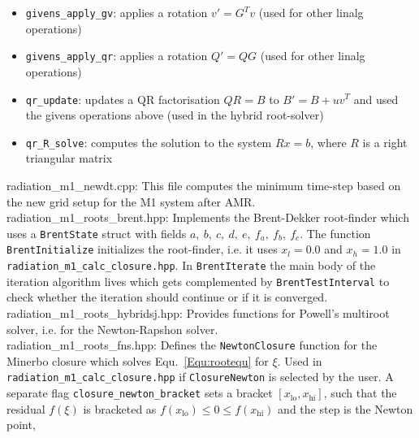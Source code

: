 \documentclass{article}
\newcommand{\var}[1]{%
  {\setlength{\fboxsep}{1.5pt}%
   \colorbox{varbg}{\textcolor{varfg}{\texttt{\small #1}}}}}
\begin{document}
\begin{itemize}
  \begin{verbatim}
    KOKKOS_INLINE_FUNCTION
    void givens_rotation(const Real &a, const Real &b, Real &c, Real &s) {
      if (b == 0) {
        c = 1;
        s = 0;
      } else if (Kokkos::fabs(b) > Kokkos::fabs(a)) {
        Real t = -a / b;
        Real s1 = 1.0 / Kokkos::sqrt(1 + t * t);
        s = s1;
        c = s1 * t;
      } else {
        Real t = -b / a;
        Real c1 = 1.0 / Kokkos::sqrt(1. + t * t);
        c = c1;
        s = c1 * t;
      }
    }
  \end{verbatim}
  \item \var{givens\_apply\_gv}: applies a rotation $v'=G^Tv$ (used for other linalg operations)
  \item \var{givens\_apply\_qr}: applies a rotation $Q'=QG$ (used for other linalg operations)
  \item \var{qr\_update}: updates a QR factorisation $QR=B$ to $B'=B+uv^T$ and used the givens operations above (used in the hybrid
  root-solver)
  \item \var{qr\_R\_solve}: computes the solution to the system $Rx=b$, where $R$ is a right triangular matrix
\end{itemize}
{\color{gray}radiation\_m1\_newdt.cpp:} This file computes the minimum time-step based on the new grid setup for the M1 system after AMR.\\
{\color{gray}radiation\_m1\_roots\_brent.hpp:} Implements the Brent-Dekker root-finder which uses a \var{BrentState} struct with fields
$a,\ b,\ c,\ d,\ e,\ f_a,\ f_b,\ f_c$. The function \var{BrentInitialize} initializes the root-finder, i.e. it uses $x_l=0.0$ and $x_h=1.0$ in
\var{radiation\_m1\_calc\_closure.hpp}. In \var{BrentIterate} the main body of the iteration algorithm lives which gets complemented by
\var{BrentTestInterval} to check whether the iteration should continue or if it is converged.\\
{\color{gray}radiation\_m1\_roots\_hybridsj.hpp:} Provides functions for Powell's multiroot solver, i.e. for the Newton-Rapshon solver.\\
{\color{gray}radiation\_m1\_roots\_fns.hpp:} Defines the \var{NewtonClosure} function for the Minerbo closure which solves Equ.~\eqref{Equ:rootequ} for $\xi$.
Used in \var{radiation\_m1\_calc\_closure.hpp} if \var{ClosureNewton} is selected by the user. A separate flag \var{closure\_newton\_bracket} sets a bracket
$[x_{\text{lo}}, x_{\text{hi}}]$, such that the residual $f(\xi)$ is bracketed as $f(x_{\text{lo}})\leq 0 \leq f(x_{\text{hi}})$ and the step is the Newton point,
\end{document}
